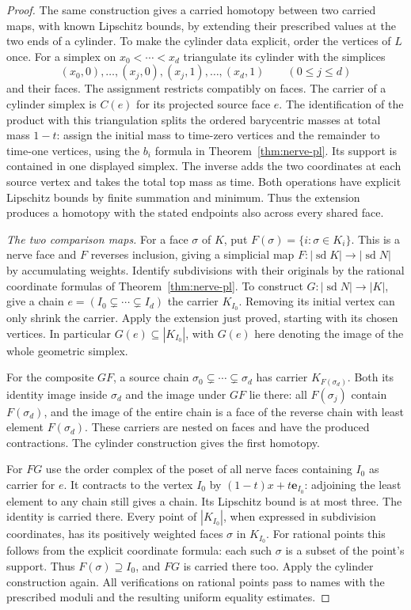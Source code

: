 \begin{proof}
The same construction gives a carried homotopy between two carried maps,
with known Lipschitz bounds, by extending their prescribed values at
the two ends of a cylinder. To make the cylinder data explicit, order
the vertices of $L$ once. For a simplex on $x_0<\cdots<x_d$ triangulate
its cylinder with the simplices
\[
 (x_0,0),\ldots,(x_j,0),(x_j,1),\ldots,(x_d,1)
 \qquad(0\le j\le d)
\]
and their faces. The assignment restricts compatibly on faces. The
carrier of a cylinder simplex is $C(e)$ for its projected source face
$e$. The identification of the product with this triangulation splits
the ordered barycentric masses at total mass $1-t$: assign the initial
mass to time-zero vertices and the remainder to time-one vertices,
using the $b_i$ formula in Theorem~\ref{thm:nerve-pl}. Its support
is contained in one displayed simplex. The inverse adds the two
coordinates at each source vertex and takes the total top mass as time.
Both operations have explicit Lipschitz bounds by finite summation and
minimum. Thus the extension produces a homotopy with the stated
endpoints also across every shared face.

\emph{The two comparison maps.}
For a face $\sigma$ of $K$, put $F(\sigma)=\{i:\sigma\in K_i\}$.
This is a nerve face and $F$ reverses inclusion, giving a simplicial
map $F:|\operatorname{sd}K|\to|\operatorname{sd}N|$ by accumulating
weights. Identify subdivisions with their originals by the rational
coordinate formulas of Theorem~\ref{thm:nerve-pl}. To construct
$G:|\operatorname{sd}N|\to |K|$, give a chain
$e=(I_0\subsetneq\cdots\subsetneq I_d)$ the carrier $K_{I_0}$.
Removing its initial vertex can only shrink the carrier. Apply the
extension just proved, starting with its chosen vertices. In particular
$G(e)\subseteq |K_{I_0}|$, with $G(e)$ here denoting the image of
the whole geometric simplex.

For the composite $GF$, a source chain
$\sigma_0\subsetneq\cdots\subsetneq\sigma_d$ has carrier
$K_{F(\sigma_d)}$. Both its identity image inside $\sigma_d$ and the
image under $GF$ lie there: all $F(\sigma_j)$ contain $F(\sigma_d)$,
and the image of the entire chain is a face of the reverse chain with
least element $F(\sigma_d)$. These carriers are nested on faces and
have the produced contractions. The cylinder construction gives the
first homotopy.

For $FG$ use the order complex of the poset of all nerve faces
containing $I_0$ as carrier for $e$. It contracts to the vertex $I_0$
by $(1-t)x+t\mathbf e_{I_0}$: adjoining the least element to any chain
still gives a chain. Its Lipschitz bound is at most three. The identity
is carried there. Every point of $|K_{I_0}|$, when expressed in
subdivision coordinates, has its positively weighted faces $\sigma$
in $K_{I_0}$. For rational points this follows from the explicit
coordinate formula: each such $\sigma$ is a subset of the point's
support. Thus $F(\sigma)\supseteq I_0$, and $FG$ is carried there too.
Apply the cylinder construction again. All verifications on rational
points pass to names with the prescribed moduli and the resulting
uniform equality estimates.


\end{proof}
